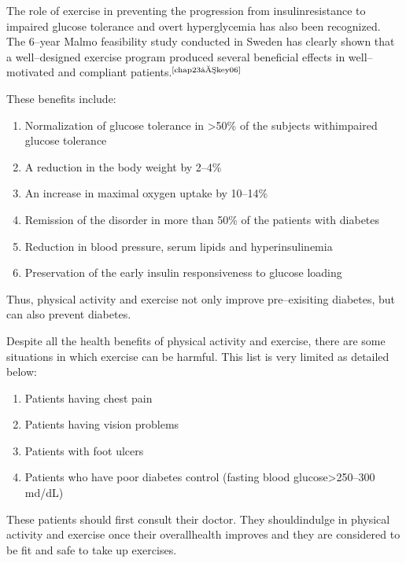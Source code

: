 The role of exercise in preventing the progression from insulin\break resistance to impaired glucose tolerance and overt hyperglycemia has also been recognized. The 6–year Malmo feasibility study conducted in Sweden has clearly shown that a well–designed exercise program produced several beneficial effects in well–motivated and compliant patients.$^{\text{\cite{chap23–key06}}}$

\noindent These benefits include:

\vspace{-\topsep}
\begin{enumerate}[•]
\itemsep=0pt
\item Normalization of glucose tolerance in \textgreater  50\% of the subjects with\break impaired glucose tolerance
\item A reduction in the body weight by 2–4\%
\item An increase in maximal oxygen uptake by 10–14\%
\item Remission of the disorder in more than 50\% of the patients with diabetes
\item Reduction in blood pressure, serum lipids and hyperinsulinemia
\item Preservation of the early insulin responsiveness to glucose loading
\end{enumerate}
\vspace{-\topsep}

Thus, physical activity and exercise not only improve pre–exisiting diabetes, but can also prevent diabetes.



Despite all the health benefits of physical activity and exercise, there are some situations in which exercise can be harmful. This list is very limited as detailed below:
\begin{enumerate}[•]
\itemsep=0pt
\item Patients having chest pain
\item Patients having vision problems
\item Patients with foot ulcers
\item Patients who have poor diabetes control (fasting blood glucose\break \textgreater  250–300 md/dL)
\end{enumerate}

These patients should first consult their doctor. They should\break indulge in physical activity and exercise once their overall\break health improves and they are considered to be fit and safe to take up exercises.

